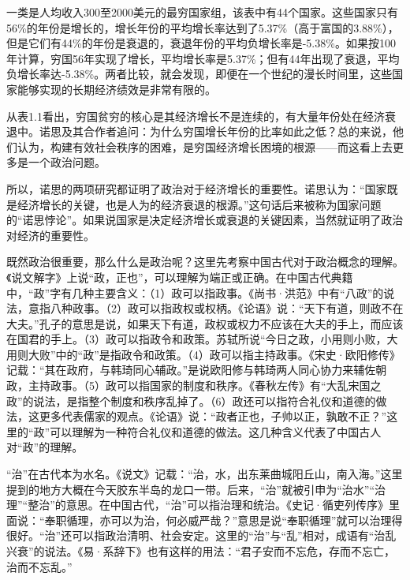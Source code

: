 一类是人均收入300至2000美元的最穷国家组，该表中有44个国家。这些国家只有56\%的年份是增长的，增长年份的平均增长率达到了5.37\%（高于富国的3.88\%），但是它们有44\%的年份是衰退的，衰退年份的平均负增长率是-5.38\%。如果按100年计算，穷国56年实现了增长，平均增长率是5.37\%；但有44年出现了衰退，平均负增长率达-5.38\%。两者比较，就会发现，即便在一个世纪的漫长时间里，这些国家能够实现的长期经济绩效是非常有限的。

从表1.1看出，穷国贫穷的核心是其经济增长不是连续的，有大量年份处在经济衰退中。诺思及其合作者追问：为什么穷国增长年份的比率如此之低？总的来说，他们认为，构建有效社会秩序的困难，是穷国经济增长困境的根源——而这看上去更多是一个政治问题。

所以，诺思的两项研究都证明了政治对于经济增长的重要性。诺思认为：“国家既是经济增长的关键，也是人为的经济衰退的根源。”这句话后来被称为国家问题的“诺思悖论”。如果说国家是决定经济增长或衰退的关键因素，当然就证明了政治对经济的重要性。


既然政治很重要，那么什么是政治呢？这里先考察中国古代对于政治概念的理解。《说文解字》上说“政，正也”，可以理解为端正或正确。在中国古代典籍中，“政”字有几种主要含义：（1）政可以指政事。《尚书·洪范》中有“八政”的说法，意指八种政事。（2）政可以指政权或权柄。《论语》说：“天下有道，则政不在大夫。”孔子的意思是说，如果天下有道，政权或权力不应该在大夫的手上，而应该在国君的手上。（3）政可以指政令和政策。苏轼所说“今日之政，小用则小败，大用则大败”中的“政”是指政令和政策。（4）政可以指主持政事。《宋史·欧阳修传》记载：“其在政府，与韩琦同心辅政。”是说欧阳修与韩琦两人同心协力来辅佐朝政，主持政事。（5）政可以指国家的制度和秩序。《春秋左传》有“大乱宋国之政”的说法，是指整个制度和秩序乱掉了。（6）政还可以指符合礼仪和道德的做法，这更多代表儒家的观点。《论语》说：“政者正也，子帅以正，孰敢不正？”这里的“政”可以理解为一种符合礼仪和道德的做法。这几种含义代表了中国古人对“政”的理解。

“治”在古代本为水名。《说文》记载：“治，水，出东莱曲城阳丘山，南入海。”这里提到的地方大概在今天胶东半岛的龙口一带。后来，“治”就被引申为“治水”“治理”“整治”的意思。在中国古代，“治”可以指治理和统治。《史记·循吏列传序》里面说：“奉职循理，亦可以为治，何必威严哉？”意思是说“奉职循理”就可以治理得很好。“治”还可以指政治清明、社会安定。这里的“治”与“乱”相对，成语有“治乱兴衰”的说法。《易·系辞下》也有这样的用法：“君子安而不忘危，存而不忘亡，治而不忘乱。”

